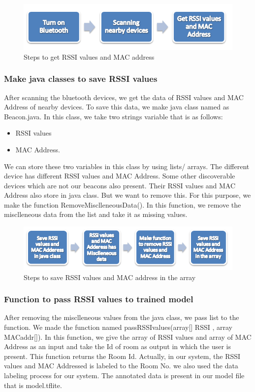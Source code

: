 \begin{figure}[h]
  		\centering
    		\includegraphics[scale=0.8]{./Figures/d2}
\caption{Steps to get RSSI values and MAC address}
\label{fig:18}
 		\end{figure}


\subsubsection{Make java classes to save RSSI values}
After scanning the bluetooth devices, we get the data of RSSI values and MAC Address of nearby devices. To save this data, we make java class named as Beacon.java. In this class, we take two strings variable that is as follows:
\begin{itemize}
\item RSSI  values 
\item MAC Address.
\end{itemize}
We can store these two variables in this class by using lists/ arrays. The different device has different RSSI values and MAC Address. Some other discoverable devices which are not our beacons also present. Their RSSI values and MAC Address also store in java class. But we want to remove this.
For this purpose, we make the function RemoveMisclleneousData(). In this function, we remove the misclleneous data from the list and take it as missing values.

\begin{figure}[h]
  		\centering
    		\includegraphics[scale=0.8]{./Figures/d3}
\caption{Steps to save RSSI values and MAC address in the array}
\label{fig:19}
 		\end{figure}


\subsubsection{Function to pass RSSI values to trained model}
After removing the misclleneous values from the java class, we pass list to the function. We made the function named passRSSIvalues(array[] RSSI , array MACaddr[]). In this function, we give the array of RSSI values and array of MAC Address as an input and take the Id of room as output in which the user is present. This function returns the Room Id. 
Actually, in our system, the RSSI values and MAC Addressed is labeled to the Room No. we also used the data labeling process for our system. The annotated data is present in our model file that is model.tflite.

